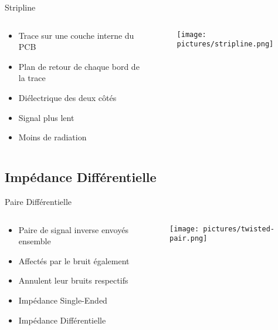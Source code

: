 \begin{frame}{Stripline}
    \begin{columns}
        \begin{column}{0.6\textwidth}
            \begin{itemize}
                \item Trace sur une couche interne du PCB
                \item Plan de retour de chaque bord de la trace
                \item Diélectrique des deux côtés
                \bigskip
                \item Signal plus lent
                \item Moins de radiation
            \end{itemize}
        \end{column}
        \begin{column}{0.4\textwidth}
            \begin{center}
                \begin{figure}
                    \centering
                    \texttt{[image: pictures/stripline.png]}
                \end{figure}
            \end{center}
        \end{column}
    \end{columns}
\end{frame}

\subsection{Impédance Différentielle}

\begin{frame}{Paire Différentielle}
    \begin{columns}
        \begin{column}{0.6\textwidth}
            \begin{itemize}
                \item Paire de signal inverse envoyés ensemble
                \item Affectés par le bruit également
                \item Annulent leur bruits respectifs
                \bigskip
                \item Impédance Single-Ended
                \item Impédance Différentielle
            \end{itemize}
        \end{column}
        \begin{column}{0.4\textwidth}
            \begin{center}
                \begin{figure}
                    \centering
                    \texttt{[image: pictures/twisted-pair.png]}
                \end{figure}
            \end{center}
        \end{column}
    \end{columns}
\end{frame}

